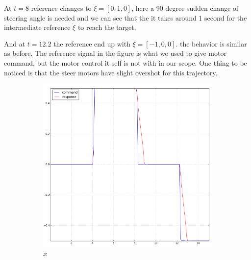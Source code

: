 At $t=8$ reference changes to $\dot{\xi}=[0,1,0]$, here a 90 degree sudden change of steering angle is needed and we can see that the it takes around 1 second for the intermediate reference $\dot{\xi}$ to reach the target.

And at $t=12.2$ the reference end up with $\dot{\xi}=[-1,0,0]$. the behavior is similar as before.  The reference signal in the figure is what we used to give motor command, but the motor control it self is not with in our scope. One thing to be noticed is that the steer motors have slight overshot for this trajectory.
\begin{figure}[!hb]
     \centering
     \begin{subfigure}[b]{0.49\textwidth}
         \centering
          \includegraphics[width=1.1\textwidth]{Figures/90_x.png}
         \caption{$\dot{x}$}
         \label{fig:90X}
     \end{subfigure}
     \hfill
     \begin{subfigure}[b]{0.49\textwidth}
         \centering

\end{subfigure}
\end{figure}
